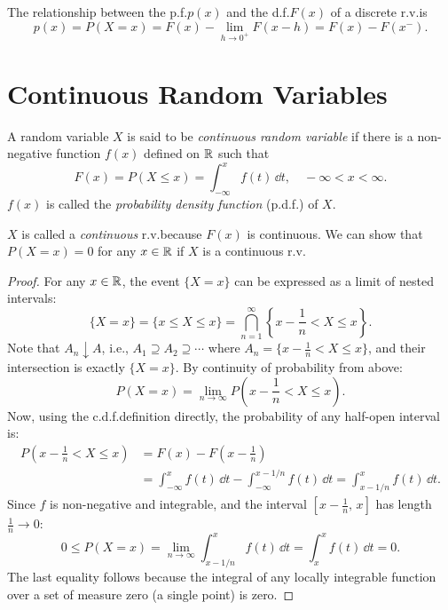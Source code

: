 The relationship between the p.f.\@ \(p(x)\) and the d.f.\@ \(F(x)\) of a discrete r.v.\@ is
\[
  p(x) = P(X = x) = F(x) - \lim_{h \to 0^+} F(x - h) = F(x) - F(x^-).
\]

\section{Continuous Random Variables}

\begin{definition}
  A random variable \(X\) is said to be \emph{continuous random variable} if there is a non-negative function \(f(x)\) defined on \(\mathbb{R}\) such that
  \[
    F(x) = P(X \leq x) = \int_{-\infty}^x f(t)\,\dd t, \quad -\infty < x < \infty.
  \]
  \(f(x)\) is called the \emph{probability density function} (p.d.f.) of \(X\).
\end{definition}

\(X\) is called a \emph{continuous} r.v.\@ because \(F(x)\) is continuous. We can show that \(P(X = x) = 0\) for any \(x \in \mathbb{R}\) if \(X\) is a continuous r.v.
\begin{proof}
  For any \(x \in \mathbb{R}\), the event \(\{X = x\}\) can be expressed as a limit of nested intervals:
  \[
    \{X = x\} = \{x \leq X \leq x\} = \bigcap_{n=1}^{\infty} \left\{x - \frac{1}{n} < X \leq x\right\}.
  \]
  Note that \(A_n \downarrow A\), i.e., $A_1 \supseteq A_2 \supseteq \cdots$ where $A_n = \{x - \frac{1}{n} < X \leq x\}$, and their intersection is exactly $\{X = x\}$. By continuity of probability from above:
  \[
    P(X = x) = \lim_{n \to \infty} P\!\left(x - \frac{1}{n} < X \leq x\right).
  \]
  Now, using the c.d.f.\@ definition directly, the probability of any half-open interval is:
  \begin{align*}
    P\!\left(x - \frac{1}{n} < X \leq x\right) & = F(x) - F\!\left(x - \frac{1}{n}\right) \\
    & = \int_{-\infty}^{x} f(t)\,\dd t - \int_{-\infty}^{x - 1/n} f(t)\,\dd t = \int_{x - 1/n}^{x} f(t)\,\dd t.
  \end{align*}
  Since $f$ is non-negative and integrable, and the interval \([x - \frac{1}{n},\, x]\) has length \(\frac{1}{n} \to 0\):
  \[
    0 \leq P(X = x) = \lim_{n\to\infty} \int_{x-1/n}^{x} f(t)\,\dd t = \int_{x}^{x} f(t)\,\dd t = 0.
  \]
  The last equality follows because the integral of any locally integrable function over a set of measure zero (a single point) is zero.
\end{proof}

